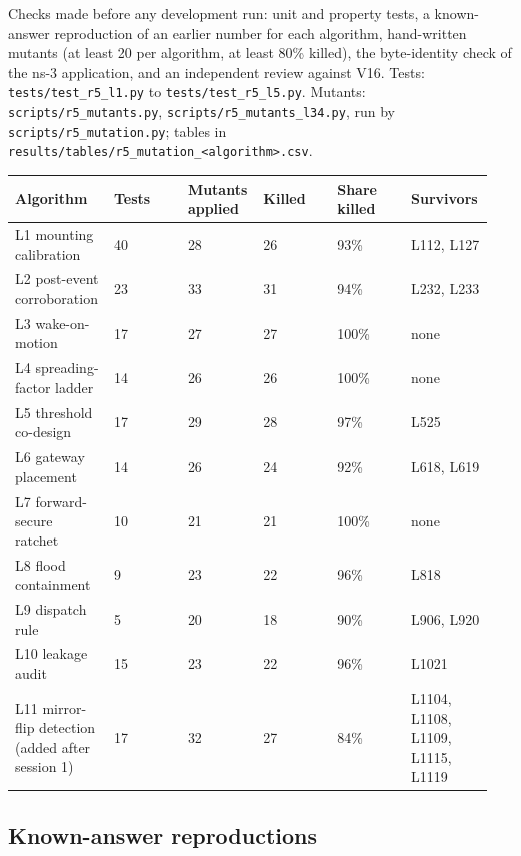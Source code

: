 


Checks made before any development run: unit and property tests, a known-answer reproduction of an earlier number for each algorithm, hand-written mutants (at least 20 per algorithm, at least 80\% killed), the byte-identity check of the ns-3 application, and an independent review against V16. Tests: \texttt{tests/test\_r5\_l1.py} to \texttt{tests/test\_r5\_l5.py}. Mutants: \texttt{scripts/r5\_mutants.py}, \texttt{scripts/r5\_mutants\_l34.py}, run by \texttt{scripts/r5\_mutation.py}; tables in \texttt{results/tables/r5\_mutation\_<algorithm>.csv}.

{\scriptsize\raggedright
\begin{longtable}{p{0.158\linewidth}p{0.158\linewidth}p{0.158\linewidth}p{0.158\linewidth}p{0.158\linewidth}p{0.158\linewidth}}
\toprule
Algorithm & Tests & Mutants applied & Killed & Share killed & Survivors \\
\midrule
\endhead
L1 mounting calibration & 40 & 28 & 26 & 93\% & L112, L127 \\
L2 post-event corroboration & 23 & 33 & 31 & 94\% & L232, L233 \\
L3 wake-on-motion & 17 & 27 & 27 & 100\% & none \\
L4 spreading-factor ladder & 14 & 26 & 26 & 100\% & none \\
L5 threshold co-design & 17 & 29 & 28 & 97\% & L525 \\
L6 gateway placement & 14 & 26 & 24 & 92\% & L618, L619 \\
L7 forward-secure ratchet & 10 & 21 & 21 & 100\% & none \\
L8 flood containment & 9 & 23 & 22 & 96\% & L818 \\
L9 dispatch rule & 5 & 20 & 18 & 90\% & L906, L920 \\
L10 leakage audit & 15 & 23 & 22 & 96\% & L1021 \\
L11 mirror-flip detection (added after session 1) & 17 & 32 & 27 & 84\% & L1104, L1108, L1109, L1115, L1119 \\
\bottomrule
\end{longtable}}

\subsection*{Known-answer reproductions}

